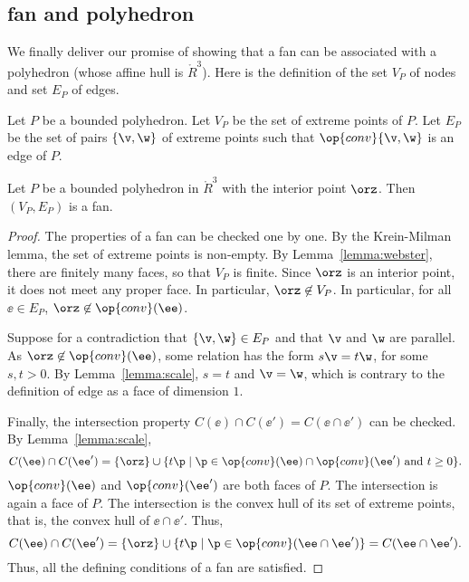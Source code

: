 \subsection{fan and polyhedron}

We finally deliver our promise of showing that a fan can be associated with
a polyhedron (whose affine hull is $\ring{R}^3$).  Here is the definition
of the set $V_P$ of nodes and set $E_P$ of edges.

\begin{definition}[$V_P,E_P$]
Let $P$ be a bounded polyhedron.  Let
$V_P$ be the set of extreme points of $P$.  Let $E_P$ be the set of pairs
$\{\v,\w\}$ of extreme points such that $\op{conv}\{\v,\w\}$ is an edge of
$P$.
\end{definition}
%
%

\begin{lemma}\label{lemma:polyhedron}%
Let $P$ be a bounded polyhedron in $\ring{R}^3$ with the interior
point $\orz$.  Then $(V_P,E_P)$ is a fan.
\end{lemma}
%

\begin{proof} The properties of a fan can be checked one by one.  By
the Krein-Milman lemma, the set of extreme points is non-empty.  By
Lemma~\ref{lemma:webster}, there are finitely many faces, so that
$V_P$ is finite.  Since $\orz$ is an interior point, it does not
meet any proper face.  In particular, $\orz\not\in V_P$.  In particular,
for all $\ee\in E_P$, $\orz\not\in \op{conv}(\ee)$.

Suppose for a contradiction that $\{\v,\w\}\in E_P$ and that $\v$
and $\w$ are parallel.  As $\orz\not\in \op{conv}(\ee)$, some
relation has the form $s \v = t \w$, for some $s, t>0$.  By
Lemma~\ref{lemma:scale}, $s=t$ and $\v=\w$, which is contrary to the
definition of edge as a face of dimension $1$.

Finally, the intersection property $C(\ee)\cap C(\ee') = C(\ee \cap
\ee')$ can be checked.  By Lemma~\ref{lemma:scale},
\begin{displaymath}
C(\ee) \cap C(\ee') =
 \{\orz\}\cup \{t \p \mid \p\in \op{conv}(\ee) \cap \op{conv}(\ee') 
\text{ and } t \ge 0\}.
\end{displaymath}
$\op{conv}(\ee)$ and $\op{conv}(\ee')$ are both faces of $P$.  The
intersection is again a face of $P$.  The intersection is the convex
hull of its set of extreme points, that is, the convex hull of $\ee \cap \ee'$.
Thus,
\begin{displaymath}
C(\ee)\cap C(\ee') = \{\orz\}\cup \{t \p \mid \p\in 
\op{conv}(\ee\cap \ee')\} = C(\ee \cap \ee').
\end{displaymath}
Thus, all the defining conditions of a fan are satisfied.
\end{proof}

